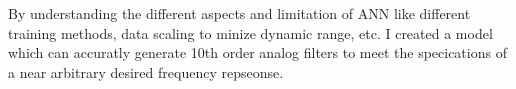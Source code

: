 \documentclass[10pt,conference]{IEEEtran}
\begin{document}
By understanding the different aspects and limitation of ANN like different training methods, data scaling to minize dynamic range, etc. I created a model which can accuratly generate 10th order analog filters to meet the specications of a near arbitrary desired frequency repseonse.










\end{document}

